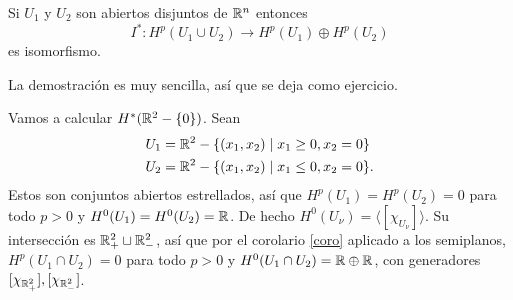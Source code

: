 \documentclass[CV.tex]{subfiles}
\begin{document}
\begin{coro}\label{coro}
Si $U_1$ y $U_2$ son abiertos disjuntos de $\mathbb{R}^n$ entonces
\[
I^*: H^p(U_1\cup U_2)\to H^p(U_1)\oplus H^p(U_2)
\]
es isomorfismo.
\end{coro}

La demostración es muy sencilla, así que se deja como ejercicio.

\begin{ej}
Vamos a calcular $H^*(\mathbb{R}^2-\{0\})$. Sean
\begin{align*}
&U_1=\mathbb{R}^2-\{(x_1,x_2)\mid x_1\geq 0, x_2=0\}\\
&U_2=\mathbb{R}^2-\{(x_1,x_2)\mid x_1\leq 0, x_2=0\}.
\end{align*}
Estos son conjuntos abiertos estrellados, así que $H^p(U_1)=H^p(U_2)=0$ para todo $p>0$ y $H^0(U_1)=H^0(U_2)=\mathbb{R}$. De hecho $H^0(U_{\nu})=\langle [\chi_{U_{\nu}}]\rangle$. Su intersección es $\mathbb{R}^2_+\sqcup\mathbb{R}^2_-$, así que por el corolario \ref{coro} aplicado a los semiplanos, $H^p(U_1\cap U_2)=0$ para todo $p>0$ y $H^0(U_1\cap U_2)=\mathbb{R}\oplus\mathbb{R}$, con generadores $[\chi_{\mathbb{R}^2_+}],[\chi_{\mathbb{R}^2_-}]$. 
\end{ej}
\end{document}
